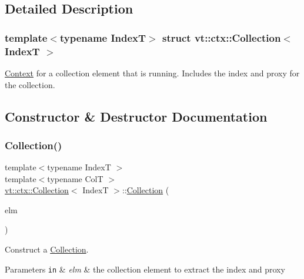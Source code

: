 \subsection{Detailed Description}
\subsubsection*{template$<$typename IndexT$>$\newline
struct vt\+::ctx\+::\+Collection$<$ Index\+T $>$}

\hyperlink{structvt_1_1ctx_1_1_context}{Context} for a collection element that is running. Includes the index and proxy for the collection. 

\subsection{Constructor \& Destructor Documentation}
\mbox{\label{structvt_1_1ctx_1_1_collection_a9ff87a5b62bc5cc55eab88eefbeedc53}} 
\subsubsection{\texorpdfstring{Collection()}{Collection()}}
{\footnotesize\ttfamily template$<$typename IndexT $>$ \\
template$<$typename ColT $>$ \\
\hyperlink{structvt_1_1ctx_1_1_collection}{vt\+::ctx\+::\+Collection}$<$ IndexT $>$\+::\hyperlink{structvt_1_1ctx_1_1_collection}{Collection} (\begin{DoxyParamCaption}\item[{\hyperlink{structvt_1_1vrt_1_1collection_1_1_collection_base}{vrt\+::collection\+::\+Collection\+Base}$<$ ColT, IndexT $>$ $\ast$}]{elm }\end{DoxyParamCaption})\hspace{0.3cm}{\ttfamily [explicit]}}



Construct a {\ttfamily \hyperlink{structvt_1_1ctx_1_1_collection}{Collection}}. 


\begin{DoxyParams}[1]{Parameters}
\mbox{\tt in}  & {\em elm} & the collection element to extract the index and proxy \\
\hline
\end{DoxyParams}


